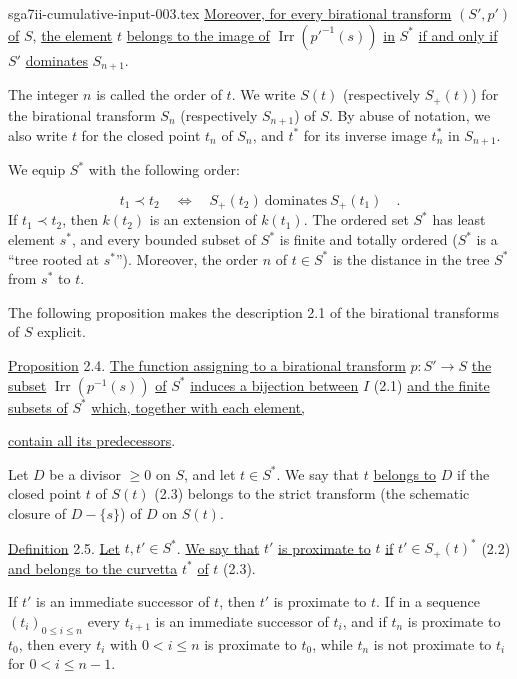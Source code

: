 \begin{filecontents*}{sga7ii-cumulative-input-003.tex}
\underline{Moreover, for every birational transform} $(S',p')$ \underline{of}
$S$, \underline{the element} $t$ \underline{belongs to the image of}
$\operatorname{Irr}(p'^{-1}(s))$ \underline{in} $S^*$ \underline{if and only if}
$S'$ \underline{dominates} $S_{n+1}$.

The integer $n$ is called the order of $t$.  We write $S(t)$ (respectively
$S_+(t)$) for the birational transform $S_n$ (respectively $S_{n+1}$) of $S$.
By abuse of notation, we also write $t$ for the closed point $t_n$ of $S_n$, and
$t^*$ for its inverse image $t_n^*$ in $S_{n+1}$.

We equip $S^*$ with the following order:

\begin{equation*}
t_1\prec t_2
\quad\Longleftrightarrow\quad
S_+(t_2)\ \text{dominates}\ S_+(t_1) \quad .
\end{equation*}
If $t_1\prec t_2$, then $k(t_2)$ is an extension of $k(t_1)$.  The ordered set
$S^*$ has least element $s^*$, and every bounded subset of $S^*$ is finite and
totally ordered ($S^*$ is a ``tree rooted at $s^*$'').  Moreover, the order $n$ of
$t\in S^*$ is the distance in the tree $S^*$ from $s^*$ to $t$.

The following proposition makes the description 2.1 of the birational
transforms of $S$ explicit.

\underline{Proposition} 2.4. \underline{The function assigning to a birational
transform} $p:S'\to S$ \underline{the subset}
$\operatorname{Irr}(p^{-1}(s))$ \underline{of} $S^*$ \underline{induces a
bijection between} $I$ (2.1) \underline{and the finite subsets of} $S^*$
\underline{which, together with each element,}


\underline{contain all its predecessors}.

Let $D$ be a divisor $\geq0$ on $S$, and let $t\in S^*$.  We say that $t$
\underline{belongs to} $D$ if the closed point $t$ of $S(t)$ (2.3) belongs to the
strict transform (the schematic closure of $D-\{s\}$) of $D$ on $S(t)$.

\underline{Definition} 2.5. \underline{Let} $t,t'\in S^*$.
\underline{We say that} $t'$ \underline{is proximate to} $t$ \underline{if}
$t'\in S_+(t)^*$ (2.2) \underline{and belongs to the curvetta} $t^*$ \underline{of}
$t$ (2.3).

If $t'$ is an immediate successor of $t$, then $t'$ is proximate to $t$.  If in a
sequence $(t_i)_{0\leq i\leq n}$ every $t_{i+1}$ is an immediate successor of
$t_i$, and if $t_n$ is proximate to $t_0$, then every $t_i$ with $0<i\leq n$ is
proximate to $t_0$, while $t_n$ is not proximate to $t_i$ for
$0<i\leq n-1$.


\end{filecontents*}
